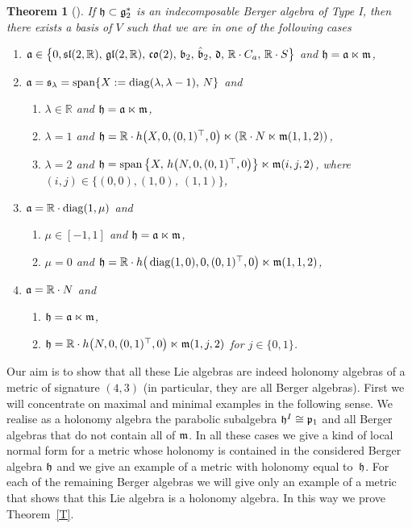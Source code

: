 \documentclass[11pt]{article}
\numberwithin{equation}{section}
\newtheorem{Theorem}{Theorem}[section]
\newcommand\fg{{\frak{g}}}
\newcommand\fh{{\frak h}}
\newcommand\fm{{\frak m}}
\newcommand\fa{{\frak a}}
\newcommand\fb{{\frak b}}
\newcommand\fd{{\frak d}}
\newcommand\fs{{\frak s}}
\newcommand{\fgl}{\mathop{{\frak g \frak l}}}
\newcommand{\fsl}{\mathop{{\frak s \frak l}}}
\newcommand{\fco}{\mathop{{\frak c \frak o}}}
\newcommand\RR{{\mathbb R}}
\newcommand{\Span}{\operatorname{span}}
\newcommand{\diag}{\operatorname{diag}}
\begin{document}
\begin{Theorem}[{{\cite{FK}}}]\label{T1}
If $\fh\subset \fg_2^*$ is an indecomposable Berger algebra of Type I, then there exists a basis of $V$ such that we are in one of the following cases
\begin{enumerate}\itemsep=0pt
\item[$1)$] $\fa\in \big\{0,\fsl(2,\RR),\, \fgl(2,\RR),\, \fco(2),\,\fb_2,\, \hat \fb_2,\, \fd,\,\RR\cdot C_a,\, \RR\cdot S\big\}$ and $\fh=\fa\ltimes \fm$,
\item[$2)$] $\fa=\fs_\lambda=\Span \{X:=\diag(\lambda,\lambda-1),\, N\}$ and
\begin{enumerate}\itemsep=0pt
\item[$a)$] $\lambda\in\RR$ and $\fh=\fa\ltimes \fm$,
\item[$b)$] $\lambda=1$ and $\fh=\RR\cdot h\big(X,0,(0,1)^\top,0\big)\ltimes (\RR\cdot N\ltimes \fm(1,1,2))$,
\item[$c)$] $\lambda=2$ and $\fh=\Span\big\{X,\, h\big(N,0,(0,1)^\top,0\big) \big\}\ltimes\fm(i,j,2)$, where $(i,j)\in\{(0,0),(1,0)$, $(1,1)\}$,
\end{enumerate}
\item[$3)$] $\fa=\RR\cdot\diag(1,\mu)$ and
\begin{enumerate}\itemsep=0pt
\item[$a)$] $\mu\in [-1,1]$ and $\fh=\fa\ltimes \fm$,
\item[$b)$] $\mu=0$ and $\fh=\RR\cdot h\big(\diag(1,0),0,(0,1)^\top,0\big)\ltimes \fm(1,1,2)$,
\end{enumerate}
\item[$4)$] $\fa=\RR\cdot N$ and
\begin{enumerate}\itemsep=0pt
\item[$a)$] $\fh=\fa\ltimes \fm$,
\item[$b)$] $\fh=\RR\cdot h\big(N,0,(0,1)^\top,0\big)\ltimes \fm(1,j,2)$ for $j\in\{0,1\}$.
\end{enumerate}
\end{enumerate}
\end{Theorem}

Our aim is to show that all these Lie algebras are indeed holonomy algebras of a metric of signature $(4,3)$ (in particular, they are all Berger algebras). First we will concentrate on maximal and minimal examples in the following sense. We realise as a holonomy algebra the parabolic subalgebra $\fh^I\cong\frak p_1$ and all Berger algebras that do not contain all of $\fm$. In all these cases we give a kind of local normal form for a metric whose holonomy is contained in the considered Berger algebra $\fh$ and we give an example of a metric with holonomy equal to~$\fh$. For each of the remaining Berger algebras we will give only an example of a metric that shows that this Lie algebra is a holonomy algebra. In this way we prove Theorem~\ref{T}.
\end{document}
